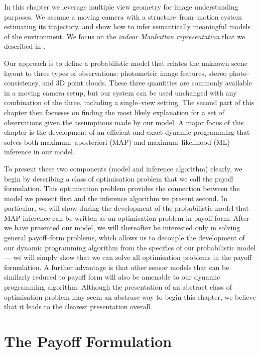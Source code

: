 In this chapter we leverage multiple view geometry for image
understanding purposes. We assume a moving camera with a
structure--from--motion system estimating its trajectory, and show how
to infer semantically meaningful models of the environment. We focus
on the \textit{indoor Manhattan
  representation}\cite{Lee09,Flint10eccv} that we described in
.

Our approach is to define a probabilistic model that relates the
unknown scene layout to three types of observations: photometric image
features, stereo photo--consistency, and 3D point clouds. These three
quantities are commonly available in a moving camera setup, but our
system can be used unchanged with any combination of the three,
including a single--view setting. The second part of this chapter then
focusses on finding the most likely explanation for a set of
observations given the assumptions made by our model. A major focus of
this chapter is the development of an efficient and exact dynamic
programming that solves both maximum--aposteriori (MAP) and
maximum--likelihood (ML) inference in our model.

To present these two components (model and inference algorithm)
clearly, we begin by describing a class of optimisation problem that
we call the payoff formulation. This optimisation problem
provides the connection between the model we present first and
the inference algorithm we present second. In particular, we will show
during the development of the probabilistic model that MAP inference
can be written as an optimisation problem in payoff form. After we
have presented our model, we will thereafter be interested only in
solving general payoff--form problems, which allows us to decouple the
development of our dynamic programming algorithm from the specifics of
our probabilistic model --- we will simply show that we can solve all
optimisation problems in the payoff formulation. A further advantage
is that other sensor models that can be similarly reduced to payoff
form will also be amenable to our dynamic programming
algorithm. Although the presentation of an abstract class of
optimisation problem may seem an abstruse way to begin this chapter,
we believe that it leads to the clearest presentation overall.

\section{The Payoff Formulation}

